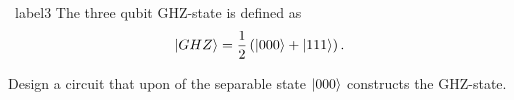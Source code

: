 \documentclass[a4paper]{tufte-handout} %
\begin{document}
\begin{prob}{~}{label3}
    The three qubit GHZ-state is defined as\[\ket{GHZ}=\frac{1}{2}\left(\ket{000}+\ket{111}\right).\]

    Design a circuit that upon of the separable state $\ket{000}$ constructs the GHZ-state.

\end{prob}

\end{document}
